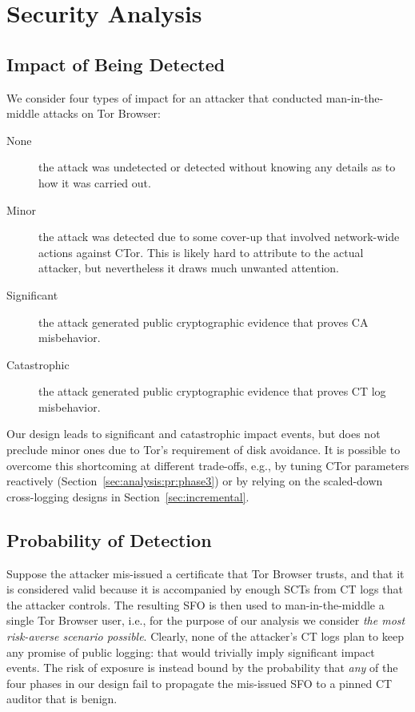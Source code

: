 \section{Security Analysis} \label{sec:analysis}

\subsection{Impact of Being Detected} \label{sec:analysis:impact}
We consider four types of impact for an attacker that conducted
man-in-the-middle attacks on Tor Browser:
\begin{description}
	\item[None] the attack was undetected or detected without knowing any
		details as to how it was carried out.
	\item[Minor] the attack was detected due to some cover-up that involved
		network-wide actions against CTor.  This is likely hard to attribute to
		the actual attacker, but nevertheless it draws much unwanted attention.
	\item[Significant] the attack generated public cryptographic evidence
		that proves CA misbehavior.
	\item[Catastrophic] the attack generated public cryptographic evidence
		that proves CT log misbehavior.
\end{description}

Our design leads to significant and catastrophic impact events, but does
not preclude minor ones due to Tor's requirement of disk avoidance.  It is
possible to overcome this shortcoming at different trade-offs, e.g., by
tuning CTor parameters reactively (Section~\ref{sec:analysis:pr:phase3}) or by
relying on the scaled-down cross-logging designs in
Section~\ref{sec:incremental}.

\subsection{Probability of Detection} \label{sec:analysis:pr}
Suppose the attacker mis-issued a certificate that Tor Browser trusts, and that
it is considered valid because it is accompanied by enough SCTs from CT logs
that the attacker controls.  The resulting SFO is then used to man-in-the-middle
a single Tor Browser user, i.e., for the purpose of our analysis we consider
\emph{the most risk-averse scenario possible}.  Clearly, none of the attacker's
CT logs plan to keep any promise of public logging:
	that would trivially imply significant impact events.
The risk of exposure is instead bound by the probability that \emph{any} of the
four phases in our design fail to propagate the mis-issued SFO to a pinned CT
auditor that is benign.

